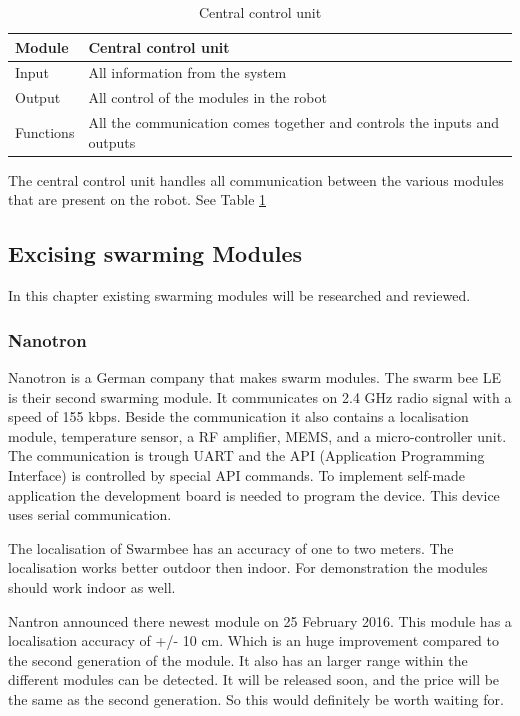 \documentclass[10pt,a4paper]{article}
\begin{document}
\begin{table}[H]
\centering
\caption{Central control unit}
\label{control}
\begin{tabular}{|l|l|}
\hline
Module    & Central control unit \\ \hline
Input  & All information from the system  \\ \hline
Output & All control of the modules in the robot \\ \hline
Functions  & All the communication comes together and controls the inputs and outputs            \\ \hline
\end{tabular}
\end{table}

The central control unit handles all communication between the various modules that are present on the robot. See Table \ref{control}



\newpage
\subsection{Excising swarming Modules}

In this chapter existing swarming modules will be researched and reviewed.

\subsubsection{Nanotron}

Nanotron is a German company that makes swarm modules. The swarm bee LE is their second swarming module. It communicates on 2.4 GHz radio signal with a speed of 155 kbps. Beside the communication it also contains a localisation module, temperature sensor, a RF amplifier, MEMS, and a micro-controller unit. The communication is trough UART and the API (Application Programming Interface) is controlled by special API commands. To implement self-made application the development board is needed to program the device. This device uses serial communication. 

The localisation of Swarmbee has an accuracy of one to two meters. The localisation works better outdoor then indoor. For demonstration the modules should work indoor as well. \cite{etotaal}

Nantron announced there newest module on 25 February 2016. This module has a localisation accuracy of +/- 10 cm. Which is an huge improvement compared to the second generation of the module. It also has an larger range within the different modules can be detected. It will be released soon, and the price will be the same as the second generation. So this would definitely be worth waiting for. \cite{nanotron}
	
\end{document}
